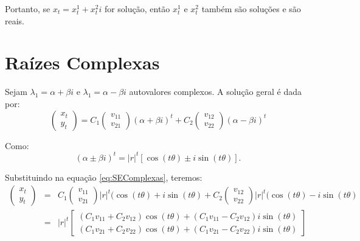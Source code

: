 Portanto, se $x_{t} = x_{t}^{1} + x_{t}^{2}i$ for solução, então $x_{t}^{1}$ e $x_{t}^{2}$ também são soluções e são reais.

\section{Raízes Complexas}

Sejam $\lambda_{1} = \alpha  + \beta {i}$ e $\lambda_{1} = \alpha - \beta {i}$ autovalores complexos. A solução geral é dada por: 
\begin{equation}\label{eq:SEComplexas}
\left(\begin{array}{c} x_{t} \\ y_{t} \end{array}\right)
=
C_1
\left(\begin{array}{c} v_{11} \\ v_{21} \end{array}\right)
(\alpha + \beta {i})^t
+
C_2
\left(\begin{array}{c} v_{12} \\ v_{22} \end{array}\right)
(\alpha - \beta {i})^t
\end{equation}


Como: 
$$(\alpha \pm \beta {i})^t = |r|^t [\cos(t\theta) \pm i\sin(t\theta)].$$

Substituindo na equação \eqref{eq:SEComplexas}, teremos: 
$$\begin{array}{rcl}
\left(\begin{array}{c} x_{t} \\ y_{t} \end{array}\right)
&=& C_1 
\left(\begin{array}{c} v_{11} \\ v_{21} \end{array}\right)
|r|^t (\cos(t\theta) + i\sin(t\theta)
+ C_2 
\left(\begin{array}{c} v_{12} \\ v_{22} \end{array}\right)
|r|^t (\cos(t\theta) - i\sin(t\theta) \\
&=& |r|^t \left[\begin{array}{c}
(C_1v_{11} + C_2v_{12}) \cos(t\theta) + (C_1v_{11} - C_2v_{12}) i \sin(t\theta) \\
(C_1v_{21} + C_2v_{22}) \cos(t\theta) + (C_1v_{21} - C_2v_{22})i\sin(t\theta) 
\end{array}\right]
\end{array}$$

